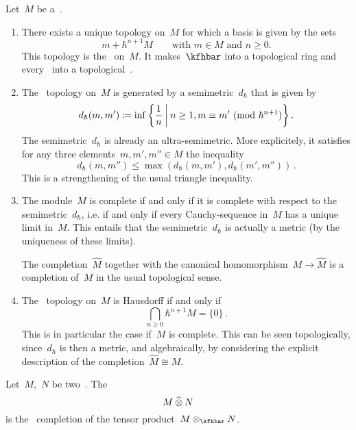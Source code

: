 \documentclass[a4paper, 11pt, oneside]{scrartcl}
\begin{document}
\begin{remark}
  Let~$M$ be a~\module{$\kfhbar$}.
  \begin{enumerate}
    \item
      There exists a unique topology on~$M$ for which a basis is given by the sets
      \[
        m + \hbar^{n+1} M
        \qquad
        \text{with~$m \in M$ and~$n \geq 0$.}
      \]
      This topology is the~ on~$M$.
      It makes~$\kfhbar$ into a topological ring and every~\module{$\kfhbar$} into a topological~\module{$\kfhbar$}.
    \item
      The~\adic{$\hbar$} topology on~$M$ is generated by a semimetric~$d_{\hbar}$ that is given by
      \[
        d_{\hbar}(m, m')
        \defined
        \inf
        {}
        \biggl\{
          \frac{1}{n}
        \suchthat[\bigg]
          n \geq 1,
          m \equiv m' \pMod{\hbar^{n+1}}
        \biggr\} \,.
      \]
      The semimetric~$d_{\hbar}$ is already an ultra-semimetric.
      More explicitely, it satisfies for any three elements~$m, m', m'' \in M$ the inequality
      \[
        d_{\hbar}(m, m'')
        \leq
        \max( d_{\hbar}(m, m'), d_{\hbar}(m', m'') ) \,.
      \]
      This is a strengthening of the usual triangle inequality.
    \item 
      The module~$M$ is complete if and only if it is complete with respect to the semimetric~$d_{\hbar}$, i.e. if and only if every Cauchy-sequence in~$M$ has a unique limit in~$M$.
      This entails that the semimetric~$d_{\hbar}$ is actually a metric (by the uniqueness of these limits).

      The completion~$\widehat{M}$ together with the canonical homomorphism~$M \to \widehat{M}$ is a completion of~$M$ in the usual topological sense.
    \item
      The~\adic{$\hbar$} topology on~$M$ is Hausdorff if and only if
      \[
        \bigcap_{n \geq 0} \hbar^{n+1} M
        =
        \{ 0 \} \,.
      \]
      This is in particular the case if~$M$ is complete.
      This can be seen topologically, since~$d_{\hbar}$ is then a metric, and algebraically, by considering the explicit description of the completion~$\widehat{M} \cong M$.
  \end{enumerate}
\end{remark}

\begin{definition}
  Let~$M$,~$N$ be two~\modules{$\kfhbar$}.
  The 
  \[
    M \mathbin{\widehat{\otimes}} N
  \]
  is the~\adic{$\hbar$} completion of the tensor product~$M \tensor_{\kfhbar} N$.
\end{definition}
\end{document}
